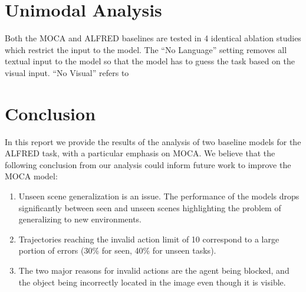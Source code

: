 \documentclass[11pt,a4paper]{article}
\begin{document}
\section{Unimodal Analysis}

Both the MOCA and ALFRED baselines are tested in 4 identical ablation studies which restrict the input to the model. The ``No Language'' setting removes all textual input to the model so that the model has to guess the task based on the visual input. ``No Visual'' refers to 


\section{Conclusion}
In this report we provide the results of the analysis of two baseline models for the ALFRED task, with a particular emphasis on MOCA. We believe that the following conclusion from our analysis could inform future work to improve the MOCA model:
\begin{enumerate}
    \item Unseen scene generalization is an issue. The performance of the models drops significantly between seen and unseen scenes highlighting the problem of generalizing to new environments.
    \item Trajectories reaching the invalid action limit of 10 correspond to a large portion of errors (30\% for seen, 40\% for unseen tasks). 
    \item The two major reasons for invalid actions are the agent being blocked, and the object being incorrectly located in the image even though it is visible.
\end{enumerate}




\clearpage



\end{document}
